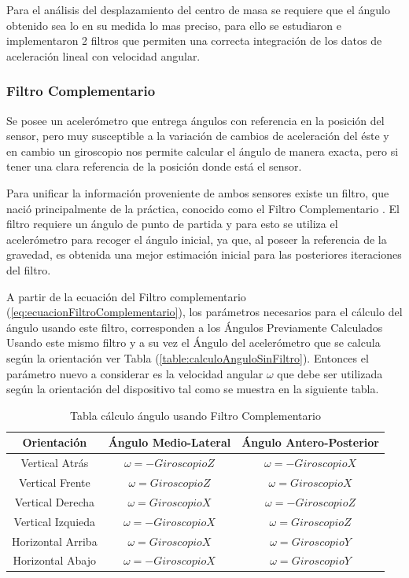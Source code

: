 \documentclass[12pt,a4paper]{article}
\begin{document}
Para el análisis del desplazamiento del centro de masa se requiere que el ángulo obtenido sea lo en su medida lo mas preciso, para ello se estudiaron e implementaron 2 filtros que permiten una correcta integración de los datos de aceleración lineal con velocidad angular.

\subsubsection{Filtro Complementario}
Se posee un acelerómetro que entrega ángulos con referencia en la posición del sensor, pero muy susceptible a la variación de cambios de aceleración del éste y en cambio un giroscopio nos permite calcular el ángulo de manera exacta, pero si tener una clara referencia de la posición donde está el sensor. 

Para unificar la información proveniente de ambos sensores existe un filtro, que nació principalmente de la práctica, conocido como el Filtro Complementario \cite{TesisUSM}.
El filtro requiere un ángulo de punto de partida y para esto se utiliza el acelerómetro para recoger el ángulo inicial, ya que, al poseer la referencia de la gravedad, es obtenida una mejor estimación inicial para las posteriores iteraciones del filtro.


A partir de la ecuación del Filtro complementario (\ref{eq:ecuacionFiltroComplementario}), los parámetros necesarios para el cálculo del ángulo usando este filtro, corresponden a los Ángulos Previamente Calculados Usando este mismo filtro y a su vez el Ángulo del acelerómetro que se calcula según la orientación ver Tabla (\ref{table:calculoAnguloSinFiltro}).
Entonces el parámetro nuevo a considerar es la velocidad angular $\omega$ que debe ser utilizada según la orientación del dispositivo tal como se muestra en la siguiente tabla.

\begin{table}[H]
	\centering
	\begin{tabular}{|c|c|c|}
		\hline 
		\textbf{Orientación} & \textbf{Ángulo Medio-Lateral} & \textbf{Ángulo Antero-Posterior} \\ 
		\hline 
		Vertical Atrás & $\omega= -GiroscopioZ$ &  $\omega= -GiroscopioX$ \\ 
		\hline 
		Vertical Frente & $\omega= GiroscopioZ$ &  $\omega= GiroscopioX$ \\
		\hline 
		Vertical Derecha & $\omega= GiroscopioX$ &  $\omega= -GiroscopioZ$ \\ 
		\hline 
		Vertical Izquieda & $\omega= -GiroscopioX$ &  $\omega= GiroscopioZ$ \\ 
		\hline 
		Horizontal Arriba & $\omega= GiroscopioX$ &  $\omega= GiroscopioY$ \\ 
		\hline 
		Horizontal Abajo & $\omega= -GiroscopioX$ &  $\omega= GiroscopioY$ \\ 
		\hline 
	\end{tabular}
	\caption{Tabla cálculo ángulo usando Filtro Complementario} 
	\label{table:calculoAnguloFiltroComplementario}
\end{table}
\end{document}
